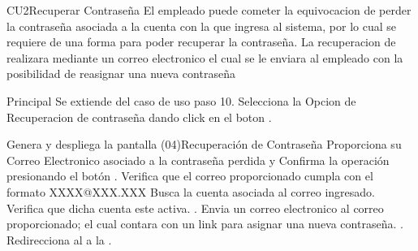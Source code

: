 \begin{UseCase}{CU2}{Recuperar Contraseña}{
		El empleado puede cometer la equivocacion de perder la contraseña asociada a la cuenta con la que ingresa al sistema, por lo cual se requiere de una forma para poder recuperar la contraseña. La recuperacion de realizara mediante un correo electronico el cual se le enviara al empleado con la posibilidad de reasignar una nueva contraseña
	}
	\end{UseCase}
	\begin{UCtrayectoria}{Principal}
		\UCpaso Se extiende del caso de uso  paso 10.
		\UCpaso[\UCactor] Selecciona la Opcion de Recuperacion de contraseña dando click en el boton .

		\UCpaso Genera y despliega la pantalla \IUref(04){Recuperación de Contraseña}
		\UCpaso [\UCactor] Proporciona su Correo Electronico asociado a la contraseña perdida y  Confirma la operación presionando el botón 			.		
		\UCpaso Verifica que el correo proporcionado cumpla con el formato XXXX@XXX.XXX 
		\UCpaso Busca la cuenta asociada al correo ingresado. 
		\UCpaso Verifica que dicha cuenta este activa. .
		\UCpaso Envia un correo electronico al correo proporcionado; el cual contara con un link para asignar una nueva contraseña. .
		\UCpaso Redirecciona al \UCactor a la  .
	\end{UCtrayectoria}

